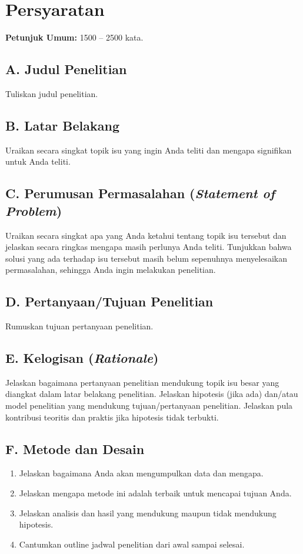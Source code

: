\documentclass[../riset_senja.tex]{subfiles}
\begin{document}
\section{Persyaratan}%
\label{sec:Persyaratan}

\noindent\textbf{Petunjuk Umum:} 1500 -- 2500 kata.

\subsection{A. Judul Penelitian}
Tuliskan judul penelitian.

\subsection{B. Latar Belakang}
Uraikan secara singkat topik isu yang ingin Anda teliti dan mengapa signifikan untuk Anda teliti.

\subsection{C. Perumusan Permasalahan (\textit{Statement of Problem})}
Uraikan secara singkat apa yang Anda ketahui tentang topik isu tersebut dan jelaskan secara ringkas mengapa masih perlunya Anda teliti. Tunjukkan bahwa solusi yang ada terhadap isu tersebut masih belum sepenuhnya menyelesaikan permasalahan, sehingga Anda ingin melakukan penelitian.

\subsection{D. Pertanyaan/Tujuan Penelitian}
Rumuskan tujuan pertanyaan penelitian.

\subsection{E. Kelogisan (\textit{Rationale})}
Jelaskan bagaimana pertanyaan penelitian mendukung topik isu besar yang diangkat dalam latar belakang penelitian. Jelaskan hipotesis (jika ada) dan/atau model penelitian yang mendukung tujuan/pertanyaan penelitian. Jelaskan pula kontribusi teoritis dan praktis jika hipotesis tidak terbukti.

\subsection{F. Metode dan Desain}
\begin{enumerate}[label=\alph*.]
	\item Jelaskan bagaimana Anda akan mengumpulkan data dan mengapa.
	\item Jelaskan mengapa metode ini adalah terbaik untuk mencapai tujuan Anda.
	\item Jelaskan analisis dan hasil yang mendukung maupun tidak mendukung hipotesis.
	\item Cantumkan outline jadwal penelitian dari awal sampai selesai.
\end{enumerate}
\end{document}
